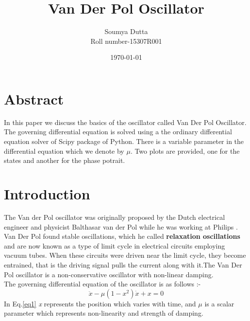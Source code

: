 \documentclass[a4paper]{article}
\begin{document}
\title{Van Der Pol Oscillator}
\author{Soumya Dutta\\
Roll number-15307R001}
\date{\today}
\maketitle
\clearpage
\tableofcontents
\clearpage

\section*{Abstract}
    In this paper we discuss the basics of the oscillator called Van Der Pol Oscillator. The governing differential equation is solved using a
    the ordinary differential equation solver of Scipy package of Python. There is a variable parameter in the differential equation which we
    denote by $\mu$. Two plots are provided, one for the states and another for the phase potrait.

\section{Introduction}
The Van der Pol oscillator was originally proposed by the Dutch electrical engineer and physicist Balthasar van der Pol while he was working at Philips \cite{van}. Van Der Pol found stable oscillations, which he called \textbf{relaxation oscillations} and are now known as a type of limit cycle in electrical circuits employing vacuum tubes. When these circuits were driven near the limit cycle, they become entrained, that is the driving signal pulls the current along with it.The Van Der Pol oscillator is a non-conservative oscillator with non-linear damping. \\
The governing differential equation of the oscillator is as follows :-
\begin{equation}\label{eq1}
    \ddot{x}-\mu (1-x^{2}) \dot{x} + x=0
\end{equation}
In Eq.\ref{eq1} \textit{x} represents the position which varies with time, and $\mu$ is a scalar parameter which represents non-linearity and 
strength of damping.
\end{document}
